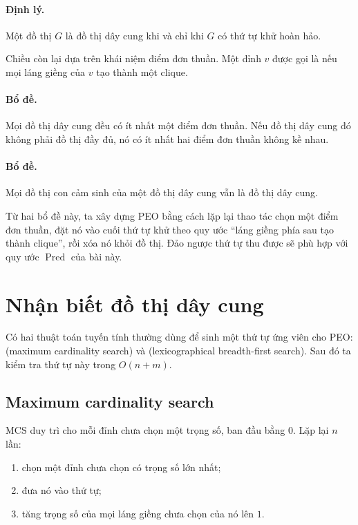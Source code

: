 \documentclass[11pt]{article}
\begin{document}
\paragraph{Định lý.}
Một đồ thị $G$ là đồ thị dây cung khi và chỉ khi $G$ có thứ tự khử hoàn hảo.

Chiều còn lại dựa trên khái niệm điểm đơn thuần. Một đỉnh $v$ được gọi là
 nếu mọi láng giềng của $v$ tạo thành một clique.

\paragraph{Bổ đề.}
Mọi đồ thị dây cung đều có ít nhất một điểm đơn thuần. Nếu đồ thị dây cung đó
không phải đồ thị đầy đủ, nó có ít nhất hai điểm đơn thuần không kề nhau.

\paragraph{Bổ đề.}
Mọi đồ thị con cảm sinh của một đồ thị dây cung vẫn là đồ thị dây cung.

Từ hai bổ đề này, ta xây dựng PEO bằng cách lặp lại thao tác chọn một điểm đơn
thuần, đặt nó vào cuối thứ tự khử theo quy ước ``láng giềng phía sau tạo thành
clique'', rồi xóa nó khỏi đồ thị. Đảo ngược thứ tự thu được sẽ phù hợp với quy
ước $\operatorname{Pred}$ của bài này.

\section{Nhận biết đồ thị dây cung}

Có hai thuật toán tuyến tính thường dùng để sinh một thứ tự ứng viên cho PEO:
 (maximum cardinality search) và  (lexicographical
breadth-first search). Sau đó ta kiểm tra thứ tự này trong $O(n+m)$.

\subsection{Maximum cardinality search}

MCS duy trì cho mỗi đỉnh chưa chọn một trọng số, ban đầu bằng $0$. Lặp lại
$n$ lần:
\begin{enumerate}
  \item chọn một đỉnh chưa chọn có trọng số lớn nhất;
  \item đưa nó vào thứ tự;
  \item tăng trọng số của mọi láng giềng chưa chọn của nó lên $1$.
\end{enumerate}
\end{document}
